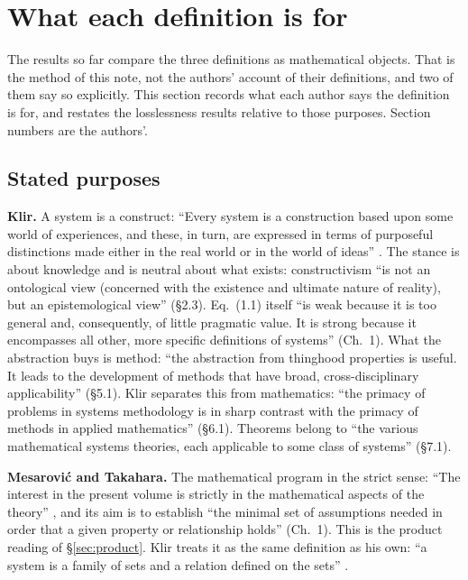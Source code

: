 \documentclass[11pt]{article}
\theoremstyle{definition}
\theoremstyle{remark}
\begin{document}
\section{What each definition is for}\label{sec:purpose}

The results so far compare the three definitions as mathematical objects. That is the method of this note, not the authors' account of their definitions, and two of them say so explicitly. This section records what each author says the definition is for, and restates the losslessness results relative to those purposes. Section numbers are the authors'.

\subsection{Stated purposes}

\textbf{Klir.} A system is a construct: ``Every system is a construction based upon some world of experiences, and these, in turn, are expressed in terms of purposeful distinctions made either in the real world or in the world of ideas'' \cite[\S2.3]{klir2001}. The stance is about knowledge and is neutral about what exists: constructivism ``is not an ontological view (concerned with the existence and ultimate nature of reality), but an epistemological view'' (\S2.3). Eq.~(1.1) itself ``is weak because it is too general and, consequently, of little pragmatic value. It is strong because it encompasses all other, more specific definitions of systems'' (Ch.~1). What the abstraction buys is method: ``the abstraction from thinghood properties is useful. It leads to the development of methods that have broad, cross-disciplinary applicability'' (\S5.1). Klir separates this from mathematics: ``the primacy of problems in systems methodology is in sharp contrast with the primacy of methods in applied mathematics'' (\S6.1). Theorems belong to ``the various mathematical systems theories, each applicable to some class of systems'' (\S7.1).

\textbf{Mesarovi\'c and Takahara.} The mathematical program in the strict sense: ``The interest in the present volume is strictly in the mathematical aspects of the theory'' \cite[Preface]{mesarovic1975}, and its aim is to establish ``the minimal set of assumptions needed in order that a given property or relationship holds'' (Ch.~1). This is the product reading of \S\ref{sec:product}. Klir treats it as the same definition as his own: ``a system is a family of sets and a relation defined on the sets'' \cite[\S3.3]{klir2001}.
\end{document}
